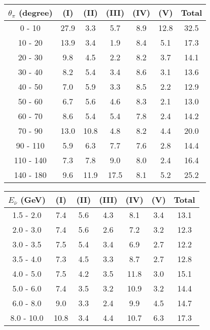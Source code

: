 \documentclass[aps, prd, reprint,showpacs,  preprintnumbers,amsmath,amssymb,superscriptaddress, nofootinbib]{revtex4-1}
\makeatletter
\newcommand{\anu}{\ensuremath{\bar{\nu}}}
\renewenvironment{table}
  {\def\@captype{table}}
  {}
\makeatother
\begin{document}
\vspace{1cm}

\begin{table}
\centering
\begin{tabular}{ccccccc}
\hline
$\theta_{\pi}$ (degree) & (I) & (II) & (III) & (IV) & (V) & Total \\
\hline
    0 -    10  &27.9  & 3.3  & 5.7  & 8.9  &12.8  &32.5 \\
   10 -    20  &13.9  & 3.4  & 1.9  & 8.4  & 5.1  &17.3 \\
   20 -    30  & 9.8  & 4.5  & 2.2  & 8.2  & 3.7  &14.1 \\
   30 -    40  & 8.2  & 5.4  & 3.4  & 8.6  & 3.1  &13.6 \\
   40 -    50  & 7.0  & 5.9  & 3.3  & 8.5  & 2.2  &12.9 \\
   50 -    60  & 6.7  & 5.6  & 4.6  & 8.3  & 2.1  &13.0 \\
   60 -    70  & 8.6  & 5.4  & 5.4  & 7.8  & 2.4  &14.2 \\
   70 -    90  &13.0  &10.8  & 4.8  & 8.2  & 4.4  &20.0 \\
   90 -   110  & 5.9  & 6.3  & 7.7  & 7.6  & 2.8  &14.4 \\
  110 -   140  & 7.3  & 7.8  & 9.0  & 8.0  & 2.4  &16.4 \\
  140 -   180  & 9.6  &11.9  &17.5  & 8.1  & 5.2  &25.2 \\
\hline
 \hline
\end{tabular}
\caption{Fractional systematic uncertainties (in percent) for $d\sigma/d\theta_\pi$.}
\label{tb:syst-pion-angle}
\end{table}

\vspace{0.5cm}

\begin{table}
\centering
\begin{tabular}{ccccccc}
\hline
$E_{\anu}$ (GeV) & (I) & (II) & (III) & (IV) & (V) & Total \\
\hline
  1.5 -   2.0  & 7.4  & 5.6  & 4.3  & 8.1  & 3.4  &13.1 \\
  2.0 -   3.0  & 7.4  & 5.6  & 2.6  & 7.2  & 3.2  &12.3 \\
  3.0 -   3.5  & 7.5  & 5.4  & 3.4  & 6.9  & 2.7  &12.2 \\
  3.5 -   4.0  & 7.3  & 4.5  & 3.3  & 8.7  & 2.7  &12.8 \\
  4.0 -   5.0  & 7.5  & 4.2  & 3.5  &11.8  & 3.0  &15.1 \\
  5.0 -   6.0  & 7.4  & 3.5  & 3.2  &10.9  & 3.2  &14.4 \\
  6.0 -   8.0  & 9.0  & 3.3  & 2.4  & 9.9  & 4.5  &14.7 \\
  8.0 -  10.0  &10.8  & 3.4  & 4.4  &10.7  & 6.3  &17.3 \\
\hline
\hline
\end{tabular}
\caption{Fractional systematic uncertainties (in percent) for $\sigma(E_{\anu})$.}
\label{tb:syst-Ev-xsec}
\end{table}
\end{document}
